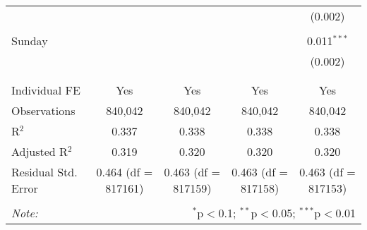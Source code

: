 \documentclass[
]{article}
\begin{document}
\begin{table}[!htbp]
{\begin{tabular}{@{\extracolsep{5pt}}lcccc}
  &  &  &  & (0.002) \\ 
  & & & & \\ 
 Sunday &  &  &  & 0.011$^{***}$ \\ 
  &  &  &  & (0.002) \\ 
  & & & & \\ 
\hline \\[-1.8ex] 
Individual FE & Yes & Yes & Yes & Yes \\ 
Observations & 840,042 & 840,042 & 840,042 & 840,042 \\ 
R$^{2}$ & 0.337 & 0.338 & 0.338 & 0.338 \\ 
Adjusted R$^{2}$ & 0.319 & 0.320 & 0.320 & 0.320 \\ 
Residual Std. Error & 0.464 (df = 817161) & 0.463 (df = 817159) & 0.463 (df = 817158) & 0.463 (df = 817153) \\ 
\hline 
\hline \\[-1.8ex] 
\textit{Note:}  & \multicolumn{4}{r}{$^{*}$p$<$0.1; $^{**}$p$<$0.05; $^{***}$p$<$0.01} \\ 
\end{tabular}
} 
\end{table} 
\newpage
\end{document}
